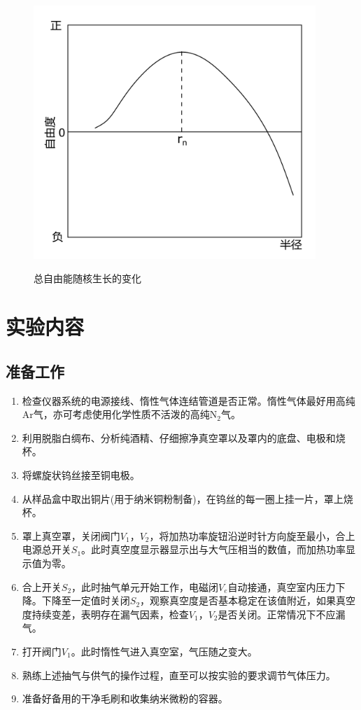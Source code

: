 \documentclass[a4paper]{article}
\begin{document}
\begin{figure}[!ht]
\begin{minipage}{0.48\textwidth}
\begin{center}
\includegraphics[width=0.95\textwidth]{fig/fig6.pdf}\\
\caption{总自由能随核生长的变化}\label{fig6}
\end{center}
\end{minipage}
\end{figure}

\section{实验内容}
\subsection{准备工作}
\begin{enumerate}
\item 检查仪器系统的电源接线、惰性气体连结管道是否正常。惰性气体最好用高纯Ar气，亦可考虑使用化学性质不活泼的高纯N$_2$气。
\item 利用脱脂白绸布、分析纯酒精、仔细擦净真空罩以及罩内的底盘、电极和烧杯。
\item 将螺旋状钨丝接至铜电极。
\item 从样品盒中取出铜片(用于纳米铜粉制备)，在钨丝的每一圈上挂一片，罩上烧杯。
\item 罩上真空罩，关闭阀门$V_1$，$V_2$，将加热功率旋钮沿逆时针方向旋至最小，合上电源总开关$S_1$。此时真空度显示器显示出与大气压相当的数值，而加热功率显示值为零。
\item 合上开关$S_2$，此时抽气单元开始工作，电磁闭$V_e$自动接通，真空室内压力下降。下降至一定值时关闭$S_2$，观察真空度是否基本稳定在该值附近，如果真空度持续变差，表明存在漏气因素，检查$V_1$，$V_2$是否关闭。正常情况下不应漏气。
\item 打开阀门$V_1$。此时惰性气进入真空室，气压随之变大。
\item 熟练上述抽气与供气的操作过程，直至可以按实验的要求调节气体压力。
\item 准备好备用的干净毛刷和收集纳米微粉的容器。
\end{enumerate}
\end{document}
